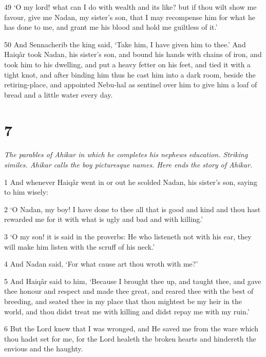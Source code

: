 \par 49 ‘O my lord! what can I do with wealth and its like? but if thou wilt show me favour, give me Nadan, my sister's son, that I may recompense him for what he has done to me, and grant me his blood and hold me guiltless of it.’

\par 50 And Sennacherib the king said, ‘Take him, I have given him to thee.’ And Haiqâr took Nadan, his sister's son, and bound his hands with chains of iron, and took him to his dwelling, and put a heavy fetter on his feet, and tied it with a tight knot, and after binding him thus he cast him into a dark room, beside the retiring-place, and appointed Nebu-hal as sentinel over him to give him a loaf of bread and a little water every day.

\chapter{7}

\par \textit{The parables of Ahikar in which he completes his nephews education. Striking similes. Ahikar calls the boy picturesque names. Here ends the story of Ahikar.}

\par 1 And whenever Haiqâr went in or out he scolded Nadan, his sister's son, saying to him wisely:

\par 2 ‘O Nadan, my boy! I have done to thee all that is good and kind and thou hast rewarded me for it with what is ugly and bad and with killing.’

\par 3 ‘O my son! it is said in the proverbs: He who listeneth not with his ear, they will make him listen with the scruff of his neck.’

\par 4 And Nadan said, ‘For what cause art thou wroth with me?’

\par 5 And Haiqâr said to him, ‘Because I brought thee up, and taught thee, and gave thee honour and respect and made thee great, and reared thee with the best of breeding, and seated thee in my place that thou mightest be my heir in the world, and thou didst treat me with killing and didst repay me with my ruin.’

\par 6 But the Lord knew that I was wronged, and He saved me from the ware which thou hadst set for me, for the Lord healeth the broken hearts and hindereth the envious and the haughty.

